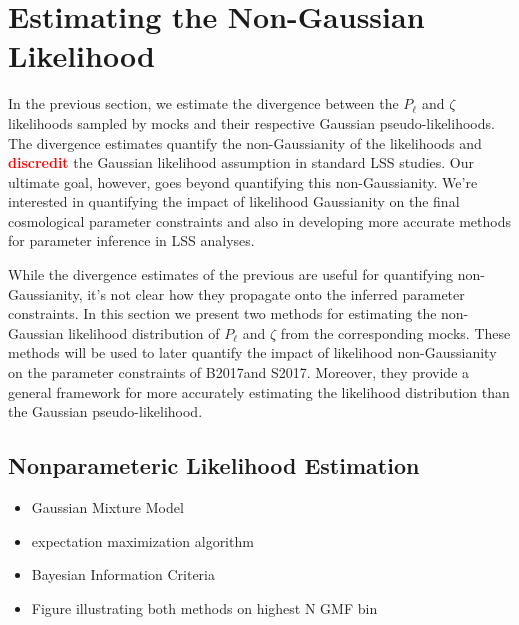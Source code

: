 \documentclass[12pt, letterpaper, preprint]{aastex}
\newcommand{\bitem}{\begin{itemize}}
\newcommand{\eitem}{\end{itemize}}
\newcommand{\todo}[1]{{\bf \textcolor{red}{#1}}}
\newcommand{\Beut}{B2017}
\newcommand{\Sinh}{S2017}
\begin{document}
\section{Estimating the Non-Gaussian Likelihood}
In the previous section, we estimate the divergence between the 
$P_\ell$ and $\zeta$ likelihoods sampled by mocks and their respective 
Gaussian pseudo-likelihoods. The divergence estimates quantify 
the non-Gaussianity of the likelihoods and \todo{discredit} the 
Gaussian likelihood assumption in standard LSS studies. Our ultimate goal, 
however, goes beyond quantifying this non-Gaussianity. We're interested 
in quantifying the impact of likelihood Gaussianity on the final 
cosmological parameter constraints and also in developing more accurate 
methods for parameter inference in LSS analyses.

While the divergence estimates of the previous are useful for 
quantifying non-Gaussianity, it's not clear how they propagate 
onto the inferred parameter constraints. In this section 
we present two methods for estimating the non-Gaussian likelihood 
distribution of $P_\ell$ and $\zeta$ from the corresponding mocks.
These methods will be used to later quantify the impact
of likelihood non-Gaussianity on the parameter constraints of 
\Beut and \Sinh. Moreover, they provide a general framework for 
more accurately estimating the likelihood distribution than 
the Gaussian pseudo-likelihood. 

\subsection{Nonparameteric Likelihood Estimation}

\bitem
    \item Gaussian Mixture Model 
    \item expectation maximization algorithm \cite{dempster1977}
    \item Bayesian Information Criteria 
    \item Figure illustrating both methods on highest N GMF bin 
\eitem
\end{document}
